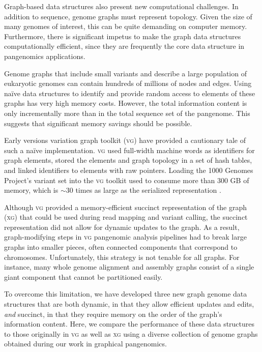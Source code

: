 \documentclass{bioinfo}
\begin{document}
Graph-based data structures also present new computational challenges.
In addition to sequence, genome graphs must represent topology.
Given the size of many genomes of interest, this can be quite demanding on computer memory.
Furthermore, there is significant impetus to make the graph data structures computationally efficient, since they are frequently the core data structure in pangenomics applications.

Genome graphs that include small variants and describe a large population of eukaryotic genomes can contain hundreds of millions of nodes and edges.
Using na\"ive data structures to identify and provide random access to elements of these graphs has very high memory costs.
However, the total information content is only incrementally more than in the total sequence set of the pangenome.
This suggests that significant memory savings should be possible.

Early versions variation graph toolkit (\textsc{vg}) \citep{Garrison_2018} have provided a cautionary tale of such a na\"ive implementation.
\textsc{vg} used full-width machine words as identifiers for graph elements, stored the elements and graph topology in a set of hash tables, and linked identifiers to elements with raw pointers.
Loading the 1000 Genomes Project's variant set into the \textsc{vg} toolkit used to consume more than 300 GB of memory, which is $\sim$30 times as large as the serialized representation \citep{Garrison_2019}.

Although \textsc{vg} provided a memory-efficient succinct representation of the graph (\textsc{xg}) that could be used during read mapping and variant calling, the succinct representation did not allow for dynamic updates to the graph.
As a result, graph-modifying steps in \textsc{vg} pangenomic analysis pipelines had to break large graphs into smaller pieces, often connected components that correspond to chromosomes.
Unfortunately, this strategy is not tenable for all graphs.
For instance, many whole genome alignment and assembly graphs consist of a single giant component that cannot be partitioned easily.

To overcome this limitation, we have developed three new graph genome data structures that are both dynamic, in that they allow efficient updates and edits, \emph{and} succinct, in that they require memory on the order of the graph's information content.
Here, we compare the performance of these data structures to those originally in \textsc{vg} as well as \textsc{xg} using a diverse collection of genome graphs obtained during our work in graphical pangenomics.
\end{document}
